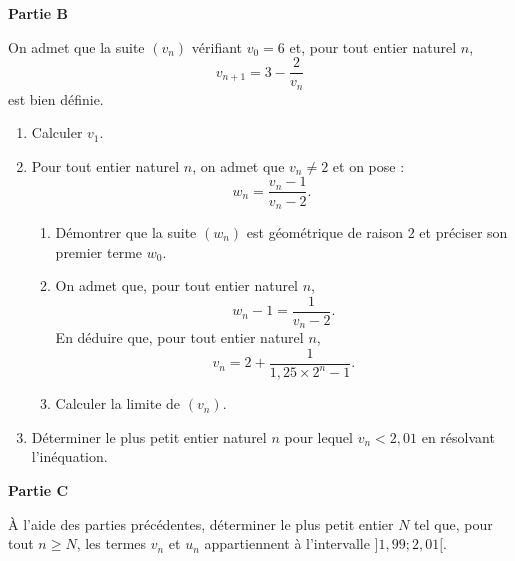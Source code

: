 \documentclass[11pt,a4paper]{article}
\begin{document}
\textbf{Partie B}

On admet que la suite $(v_n)$ vérifiant $v_0=6$ et, pour tout entier naturel $n$,
\[
v_{n+1}=3-\dfrac{2}{v_n}
\]
est bien définie.

\begin{enumerate}
  \item Calculer $v_1$.
  \item Pour tout entier naturel $n$, on admet que $v_n\neq 2$ et on pose :
  \[
w_n=\dfrac{v_n-1}{v_n-2}.
  \]
  \begin{enumerate}
    \item Démontrer que la suite $(w_n)$ est géométrique de raison $2$ et préciser son premier terme $w_0$.
    \item On admet que, pour tout entier naturel $n$,
    \[
w_n-1=\dfrac{1}{v_n-2}.
    \]
    En déduire que, pour tout entier naturel $n$,
    \[
v_n=2+\dfrac{1}{1{,}25\times 2^n-1}.
    \]
    \item Calculer la limite de $(v_n)$.
  \end{enumerate}
  \item Déterminer le plus petit entier naturel $n$ pour lequel $v_n<2{,}01$ en résolvant l'inéquation.
\end{enumerate}

\textbf{Partie C}

À l'aide des parties précédentes, déterminer le plus petit entier $N$ tel que, pour tout $n\geqslant N$, les termes $v_n$ et $u_n$ appartiennent à l'intervalle $]1{,}99;2{,}01[$.
\end{document}
